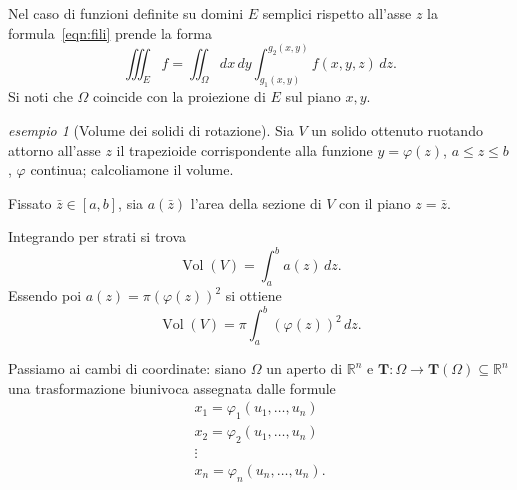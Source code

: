 \documentclass[a4paper]{book}
\DeclareMathOperator{\Vol}{Vol}
\numberwithin{equation}{section}
\renewcommand{\phi}{\varphi}
\theoremstyle{plain}
\theoremstyle{definition}
\theoremstyle{remark}
\renewcommand{\vec}{\boldsymbol}
\theoremstyle{example}
\newtheorem{exmp}{esempio}[section]
\begin{document}
Nel caso di funzioni definite su domini $E$ semplici rispetto all'asse $z$ la formula~\eqref{eqn:fili} prende la forma
	\begin{equation}
		\iiint_E f = \iint_{\Omega} dx \, dy \int_{g_1(x, y)}^{g_2(x, y)}f(x, y, z)\, dz.
	\end{equation}
	Si noti che $\Omega$ coincide con la proiezione di $E$ sul piano $x, y$.

	\begin{exmp}[Volume dei solidi di rotazione]
Sia $V$ un solido ottenuto ruotando attorno all'asse $z$ il trapezioide corrispondente alla funzione $y = \phi(z)$, $a \le z \le b$, $\phi$ continua; calcoliamone il volume.

Fissato $\bar{z} \in [a, b]$, sia $a(\bar{z})$ l'area della sezione di $V$ con il piano $z = \bar{z}$.

Integrando per strati si trova
	\begin{equation*}
		\Vol(V) = \int_a^b a(z)\,dz.
	\end{equation*}
Essendo poi $a(z) = \pi(\phi(z))^2$ si ottiene
	\begin{equation*}
		\Vol(V) = \pi \int_a^b (\phi(z))^2\,dz.
	\end{equation*}
	\end{exmp}

Passiamo ai cambi di coordinate: siano $\Omega$ un aperto di $\mathbb{R}^n$ e $\vec{T}\colon\Omega \to \vec{T}(\Omega) \subseteq \mathbb{R}^n$ una trasformazione biunivoca assegnata dalle formule
	\begin{gather*}
		x_1 = \phi_1(u_1, \dots, u_n) \\
		x_2 = \phi_2(u_1, \dots, u_n) \\
		\vdots \\
		x_ n = \phi_n(u_n, \dots, u_n).
	\end{gather*}
\end{document}
